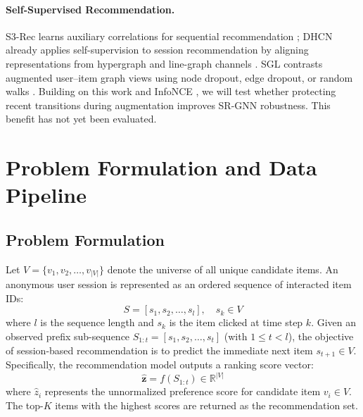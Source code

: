 \documentclass[11pt]{article}
\begin{document}
\paragraph{Self-Supervised Recommendation.} S3-Rec learns auxiliary correlations for sequential recommendation \citep{zhou2020s3rec}; DHCN already applies self-supervision to session recommendation by aligning representations from hypergraph and line-graph channels \citep{xia2021self}. SGL contrasts augmented user--item graph views using node dropout, edge dropout, or random walks \citep{wu2021self}. Building on this work and InfoNCE \citep{oord2018representation}, we will test whether protecting recent transitions during augmentation improves SR-GNN robustness. This benefit has not yet been evaluated.

\section{Problem Formulation and Data Pipeline}\label{sec:data}

\subsection{Problem Formulation}
Let $V = \{v_1, v_2, \dots, v_{|V|}\}$ denote the universe of all unique candidate items. An anonymous user session is represented as an ordered sequence of interacted item IDs:
\begin{equation}
  S = [s_1, s_2, \dots, s_l], \quad s_k \in V
\end{equation}
where $l$ is the sequence length and $s_k$ is the item clicked at time step $k$. Given an observed prefix sub-sequence $S_{1:t} = [s_1, s_2, \dots, s_t]$ (with $1 \le t < l$), the objective of session-based recommendation is to predict the immediate next item $s_{t+1} \in V$. Specifically, the recommendation model outputs a ranking score vector:
\begin{equation}
  \hat{\mathbf{z}} = f(S_{1:t}) \in \mathbb{R}^{|V|}
\end{equation}
where $\hat{z}_i$ represents the unnormalized preference score for candidate item $v_i \in V$. The top-$K$ items with the highest scores are returned as the recommendation set.
\end{document}
